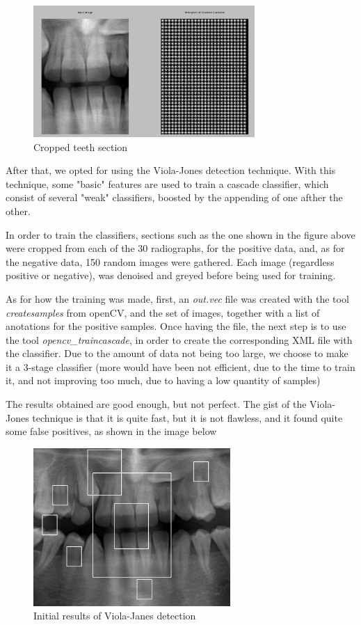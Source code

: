 \begin{figure}[h]
  \centering
  \includegraphics[height=5cm]{img/teeth_hog}
  \caption{Cropped teeth section}
\end{figure}

After that, we opted for using the Viola-Jones detection technique. With this
technique, some "basic" features are used to train a cascade classifier, which
consist of several "weak" classifiers, boosted by the appending of one afther
the other. 

In order to train the classifiers, sections such as the one shown in the figure
above were cropped from each of the 30 radiographs, for the positive data, and,
as for the negative data, 150 random images were gathered. Each image
(regardless positive or negative), was denoised and greyed before being used for
training. 

As for how the training was made, first, an \textit{out.vec} file was created with the
tool \textit{createsamples} from openCV, and the set of images, together with a list
of anotations for the positive samples. Once having the file, the next step
is to use the tool \textit{opencv\_traincascade}, in order to create the
corresponding XML file with the classifier. Due to the amount of data not
being too large, we choose to make it a 3-stage classifier (more would have been
not efficient, due to the time to train it, and not improving too much, due to
having a low quantity of samples)

The results obtained are good enough, but not perfect. The gist of
the Viola-Jones technique is that it is quite fast, but it is not flawless, and
it found quite some false positives, as shown in the image below

\begin{figure}[h]
  \centering
  \includegraphics[height=6cm]{img/teeth_detection_1}
  \caption{Initial results of Viola-Janes detection}
\end{figure}

